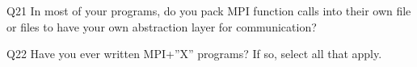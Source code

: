 \begin{description}%
\item{Q21} In most of your programs, do you pack MPI function calls into their own file or files to have your own abstraction layer for communication?%
\item{Q22} Have you ever written MPI+”X” programs? If so, select all that apply.%
\end{description}%
